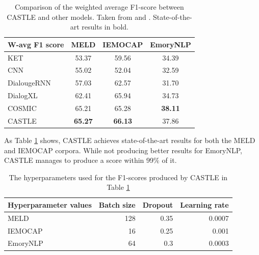 \documentclass[nofilelist]{cslthse-msc}
\begin{document}
\begin{table}[!ht]
\begin{center}
\begin{tabular}{lccc}
\hline
\textbf{W-avg F1 score} & \textbf{MELD}           & \textbf{IEMOCAP}        & \textbf{EmoryNLP}  \\ \hline
KET                     & 53.37           & 59.56          & 34.39 \\
CNN                     & 55.02           & 52.04          & 32.59 \\
DialougeRNN             & 57.03           & 62.57          & 31.70 \\
DialogXL                & 62.41           & 65.94          & 34.73 \\
COSMIC                  & 65.21           & 65.28          & \textbf{38.11} \\ \hline
CASTLE                  & \textbf{65.27} & \textbf{66.13} & 37.86\\ \hline
\end{tabular}
\end{center}
\caption{Comparison of the weighted average F1-score between CASTLE and other models. Taken from \citet{ghosal2020cosmic} and \citet{Shen2020DialogXLAX}. State-of-the-art results in bold. }
\label{results_table}
\end{table}

As Table \ref{results_table} shows, CASTLE achieves state-of-the-art results for both the MELD and IEMOCAP corpora. While not producing better results for EmoryNLP, CASTLE manages to produce a score within 99$\%$ of it.

\begin{table}[!ht]
\begin{center}
\begin{tabular}{lrrr}
\hline
\textbf{Hyperparameter values} & \textbf{Batch size}           & \textbf{Dropout}        & \textbf{Learning rate}  \\ \hline
MELD                     & 128          & 0.35          & 0.0007 \\
IEMOCAP                     & 16           & 0.25          & 0.001 \\
EmoryNLP             & 64           & 0.3          & 0.0003 \\ \hline
\end{tabular}
\end{center}
\caption{The hyperparameters used for the F1-scores produced by CASTLE in Table \ref{results_table}}
\label{hyper_table}
\end{table}
\end{document}
